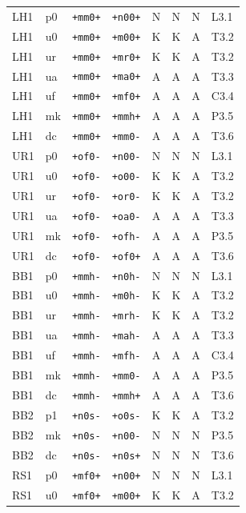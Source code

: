 {\begin{longtable}{@{}llllcccl@{}}
LH1 & p0 & \texttt{+mm0+} & \texttt{+n00+} & N & N & N & L3.1 \\
LH1 & u0 & \texttt{+mm0+} & \texttt{+m00+} & K & K & A & T3.2 \\
LH1 & ur & \texttt{+mm0+} & \texttt{+mr0+} & K & K & A & T3.2 \\
LH1 & ua & \texttt{+mm0+} & \texttt{+ma0+} & A & A & A & T3.3 \\
LH1 & uf & \texttt{+mm0+} & \texttt{+mf0+} & A & A & A & C3.4 \\
LH1 & mk & \texttt{+mm0+} & \texttt{+mmh+} & A & A & A & P3.5 \\
LH1 & dc & \texttt{+mm0+} & \texttt{+mm0-} & A & A & A & T3.6 \\
UR1 & p0 & \texttt{+of0-} & \texttt{+n00-} & N & N & N & L3.1 \\
UR1 & u0 & \texttt{+of0-} & \texttt{+o00-} & K & K & A & T3.2 \\
UR1 & ur & \texttt{+of0-} & \texttt{+or0-} & K & K & A & T3.2 \\
UR1 & ua & \texttt{+of0-} & \texttt{+oa0-} & A & A & A & T3.3 \\
UR1 & mk & \texttt{+of0-} & \texttt{+ofh-} & A & A & A & P3.5 \\
UR1 & dc & \texttt{+of0-} & \texttt{+of0+} & A & A & A & T3.6 \\
BB1 & p0 & \texttt{+mmh-} & \texttt{+n0h-} & N & N & N & L3.1 \\
BB1 & u0 & \texttt{+mmh-} & \texttt{+m0h-} & K & K & A & T3.2 \\
BB1 & ur & \texttt{+mmh-} & \texttt{+mrh-} & K & K & A & T3.2 \\
BB1 & ua & \texttt{+mmh-} & \texttt{+mah-} & A & A & A & T3.3 \\
BB1 & uf & \texttt{+mmh-} & \texttt{+mfh-} & A & A & A & C3.4 \\
BB1 & mk & \texttt{+mmh-} & \texttt{+mm0-} & A & A & A & P3.5 \\
BB1 & dc & \texttt{+mmh-} & \texttt{+mmh+} & A & A & A & T3.6 \\
BB2 & p1 & \texttt{+n0s-} & \texttt{+o0s-} & K & K & A & T3.2 \\
BB2 & mk & \texttt{+n0s-} & \texttt{+n00-} & N & N & N & P3.5 \\
BB2 & dc & \texttt{+n0s-} & \texttt{+n0s+} & N & N & N & T3.6 \\
RS1 & p0 & \texttt{+mf0+} & \texttt{+n00+} & N & N & N & L3.1 \\
RS1 & u0 & \texttt{+mf0+} & \texttt{+m00+} & K & K & A & T3.2 \\

\end{longtable}}
